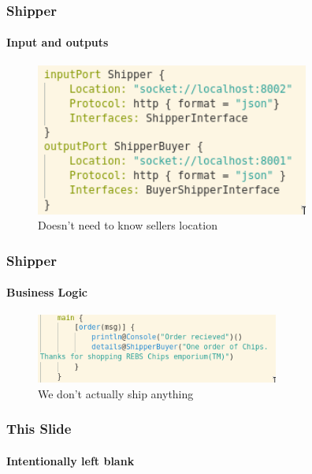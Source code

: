 \documentclass{beamer}
\begin{document}
    \begin{frame}[t]
        \frametitle{Shipper}
        \framesubtitle{Input and outputs}
\begin{figure}[!h]
    \centering
    \includegraphics[height=5cm]{images2/shipperio.png}
    \caption{Doesn't need to know sellers location}
    \label{fig:a2p2}
\end{figure}
    \end{frame}
    \begin{frame}[t]
        \frametitle{Shipper}
        \framesubtitle{Business Logic}
\begin{figure}[!h]
    \centering
    \includegraphics[width=8cm]{images2/shipperlogic.png}
    \caption{We don't actually ship anything }
    \label{fig:a2p2}
\end{figure}
    \end{frame}
    \begin{frame}[t]
        \frametitle{This Slide}
        \framesubtitle{Intentionally left blank}
    \end{frame}

\end{document}
